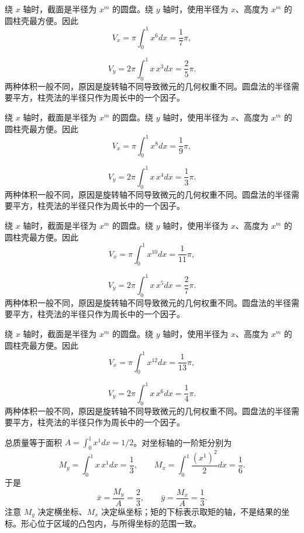 \documentclass[UTF8,12pt,a4paper,fontset=fandol]{ctexart}
\begin{document}
\begin{solve}\label{ans:c21q9}
绕 $x$ 轴时，截面是半径为 $x^m$ 的圆盘。绕 $y$ 轴时，使用半径为 $x$、高度为 $x^m$ 的圆柱壳最方便。因此
\[
V_x=\pi\int_0^1x^{6}dx=\frac{1}{7}\pi,
\]

\[
V_y=2\pi\int_0^1x\,x^{3}dx=\frac{2}{5}\pi.
\]
两种体积一般不同，原因是旋转轴不同导致微元的几何权重不同。圆盘法的半径需要平方，柱壳法的半径只作为周长中的一个因子。
\end{solve}

\begin{solve}\label{ans:c21q10}
绕 $x$ 轴时，截面是半径为 $x^m$ 的圆盘。绕 $y$ 轴时，使用半径为 $x$、高度为 $x^m$ 的圆柱壳最方便。因此
\[
V_x=\pi\int_0^1x^{8}dx=\frac{1}{9}\pi,
\]

\[
V_y=2\pi\int_0^1x\,x^{4}dx=\frac{1}{3}\pi.
\]
两种体积一般不同，原因是旋转轴不同导致微元的几何权重不同。圆盘法的半径需要平方，柱壳法的半径只作为周长中的一个因子。
\end{solve}

\begin{solve}\label{ans:c21q11}
绕 $x$ 轴时，截面是半径为 $x^m$ 的圆盘。绕 $y$ 轴时，使用半径为 $x$、高度为 $x^m$ 的圆柱壳最方便。因此
\[
V_x=\pi\int_0^1x^{10}dx=\frac{1}{11}\pi,
\]

\[
V_y=2\pi\int_0^1x\,x^{5}dx=\frac{2}{7}\pi.
\]
两种体积一般不同，原因是旋转轴不同导致微元的几何权重不同。圆盘法的半径需要平方，柱壳法的半径只作为周长中的一个因子。
\end{solve}

\begin{solve}\label{ans:c21q12}
绕 $x$ 轴时，截面是半径为 $x^m$ 的圆盘。绕 $y$ 轴时，使用半径为 $x$、高度为 $x^m$ 的圆柱壳最方便。因此
\[
V_x=\pi\int_0^1x^{12}dx=\frac{1}{13}\pi,
\]

\[
V_y=2\pi\int_0^1x\,x^{6}dx=\frac{1}{4}\pi.
\]
两种体积一般不同，原因是旋转轴不同导致微元的几何权重不同。圆盘法的半径需要平方，柱壳法的半径只作为周长中的一个因子。
\end{solve}

\begin{solve}\label{ans:c21q13}
总质量等于面积 $A=\int_0^1x^{1}dx=1/2$。对坐标轴的一阶矩分别为
\[
M_y=\int_0^1x\,x^{1}dx=\frac1{3},\qquad M_x=\int_0^1\frac{(x^{1})^2}2dx=\frac1{6}.
\]
于是
\[
\bar x=\frac{M_y}A=\frac{2}{3},\qquad\bar y=\frac{M_x}A=\frac{1}{3}.
\]
注意 $M_y$ 决定横坐标、$M_x$ 决定纵坐标；矩的下标表示取矩的轴，不是结果的坐标。形心位于区域的凸包内，与所得坐标的范围一致。
\end{solve}
\end{document}

